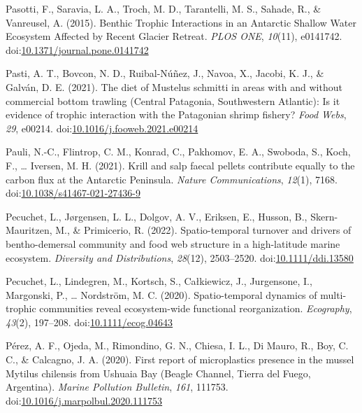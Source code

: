 \documentclass[
]{article}
\newlength{\cslhangindent}
\newenvironment{CSLReferences}[2] %
 {\begin{list}{}{%
  \setlength{\itemindent}{0pt}
  \setlength{\leftmargin}{0pt}
  \setlength{\parsep}{0pt}
  \ifodd #1
   \setlength{\leftmargin}{\cslhangindent}
   \setlength{\itemindent}{-1\cslhangindent}
  \fi
  \setlength{\itemsep}{#2\baselineskip}}}
 {\end{list}}
\begin{document}
\begin{CSLReferences}{1}{0}
Pasotti, F., Saravia, L. A., Troch, M. D., Tarantelli, M. S., Sahade,
R., \& Vanreusel, A. (2015). Benthic {Trophic Interactions} in an
{Antarctic Shallow Water Ecosystem Affected} by {Recent Glacier
Retreat}. \emph{PLOS ONE}, \emph{10}(11), e0141742.
doi:\href{https://doi.org/10.1371/journal.pone.0141742}{10.1371/journal.pone.0141742}

Pasti, A. T., Bovcon, N. D., Ruibal-Núñez, J., Navoa, X., Jacobi, K. J.,
\& Galván, D. E. (2021). The diet of {Mustelus} schmitti in areas with
and without commercial bottom trawling ({Central Patagonia},
{Southwestern Atlantic}): {Is} it evidence of trophic interaction with
the {Patagonian} shrimp fishery? \emph{Food Webs}, \emph{29}, e00214.
doi:\href{https://doi.org/10.1016/j.fooweb.2021.e00214}{10.1016/j.fooweb.2021.e00214}

Pauli, N.-C., Flintrop, C. M., Konrad, C., Pakhomov, E. A., Swoboda, S.,
Koch, F., \ldots{} Iversen, M. H. (2021). Krill and salp faecal pellets
contribute equally to the carbon flux at the {Antarctic Peninsula}.
\emph{Nature Communications}, \emph{12}(1), 7168.
doi:\href{https://doi.org/10.1038/s41467-021-27436-9}{10.1038/s41467-021-27436-9}

Pecuchet, L., Jørgensen, L. L., Dolgov, A. V., Eriksen, E., Husson, B.,
Skern-Mauritzen, M., \& Primicerio, R. (2022). Spatio-temporal turnover
and drivers of bentho-demersal community and food web structure in a
high-latitude marine ecosystem. \emph{Diversity and Distributions},
\emph{28}(12), 2503--2520.
doi:\href{https://doi.org/10.1111/ddi.13580}{10.1111/ddi.13580}

Pecuchet, L., Lindegren, M., Kortsch, S., Całkiewicz, J., Jurgensone,
I., Margonski, P., \ldots{} Nordström, M. C. (2020). Spatio-temporal
dynamics of multi-trophic communities reveal ecosystem-wide functional
reorganization. \emph{Ecography}, \emph{43}(2), 197--208.
doi:\href{https://doi.org/10.1111/ecog.04643}{10.1111/ecog.04643}

Pérez, A. F., Ojeda, M., Rimondino, G. N., Chiesa, I. L., Di Mauro, R.,
Boy, C. C., \& Calcagno, J. A. (2020). First report of microplastics
presence in the mussel {Mytilus} chilensis from {Ushuaia Bay} ({Beagle
Channel}, {Tierra} del {Fuego}, {Argentina}). \emph{Marine Pollution
Bulletin}, \emph{161}, 111753.
doi:\href{https://doi.org/10.1016/j.marpolbul.2020.111753}{10.1016/j.marpolbul.2020.111753}


\end{CSLReferences}
\end{document}
